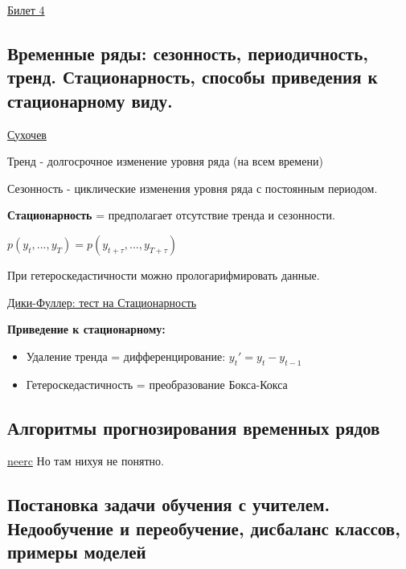 \documentclass{article}
\begin{document}
\hyperref[sec:quality_measures]{Билет 4}

\subsection{Временные ряды: сезонность, периодичность, тренд. Стационарность, способы
приведения к стационарному виду.}

\href{
	https://storage.yandexcloud.net/emkn/private/3/courses/2021-spring/SP-machine-learning-2/slides/machine_learning_2_lecture_120221.pdf?X-Amz-Algorithm=AWS4-HMAC-SHA256&X-Amz-Credential=YCAJEMFjtZXt0XJq57jJdKQB_%
}{Сухочев}

Тренд - долгосрочное изменение уровня ряда (на всем времени)

Сезонность - циклические изменения уровня ряда с постоянным периодом.

\textbf{Стационарность} = предполагает отсутствие тренда и сезонности.

$p(y_t, ..., y_T) = p(y_{t+\tau}, ..., y_{T+\tau})$

При гетероскедастичности можно прологарифмировать данные.

\href{
	https://ru.wikipedia.org/wiki/%
}{Дики-Фуллер: тест на Стационарность}

\textbf{Приведение к стационарному:}
\begin{itemize}
	\item Удаление тренда = дифференцирование: $y_t' = y_t - y_{t-1}$
	\item Гетероскедастичность = преобразование Бокса-Кокса
\end{itemize}


\subsection{Алгоритмы прогнозирования временных рядов}

\href{
	https://neerc.ifmo.ru/wiki/index.php?title=%
}{neerc} Но там нихуя не понятно.


\subsection{Постановка задачи обучения с учителем. Недообучение и переобучение,
дисбаланс классов, примеры моделей}
\end{document}
